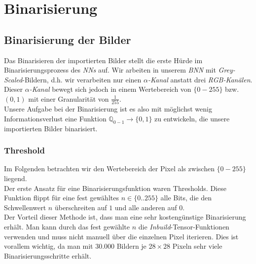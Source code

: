 \chapter{Binarisierung}
\section{Binarisierung der Bilder}
Das Binarisieren der importierten Bilder stellt die erste Hürde im Binarisierungsprozess des \textit{NNs} auf. Wir arbeiten in unserem \textit{BNN} mit \textit{Grey-Scaled}-Bildern, d.h. wir verarbeiten nur einen $\alpha$\textit{-Kanal} anstatt drei \textit{RGB-Kanälen}. Dieser $\alpha$\textit{-Kanal} bewegt sich jedoch in einem Wertebereich von $\{0-255\}$ bzw. $(0,1)$ mit einer Granularität von $\frac{1}{255}$.\\

Unsere Aufgabe bei der Binarisierung ist es also mit möglichst wenig Informationsverlust eine Funktion $\mathbb{Q}_{0-1} \rightarrow \{0,1\}$ zu entwickeln, die unsere importierten Bilder binarisiert.

\subsection{Threshold}

Im Folgenden betrachten wir den Wertebereich der Pixel als zwischen $\{0-255\}$ liegend.\\Der erste Ansatz für eine Binarisierungsfunktion waren Thresholds. Diese Funktion flippt für eine fest gewähltes $n \in \{0..255\}$ alle Bits, die den Schwellenwert $n$ überschreiten auf $1$ und alle anderen auf $0$.\\

Der Vorteil dieser Methode ist, dass man eine sehr kostengünstige Binarisierung erhält. Man kann durch das fest gewählte $n$ die \textit{Inbuild}-Tensor-Funktionen verwenden und muss nicht manuell über die einzelnen Pixel iterieren. Dies ist vorallem wichtig, da man mit $30.000$ Bildern je $28 \times 28$ Pixeln sehr viele Binarisierungsschritte erhält.\\

